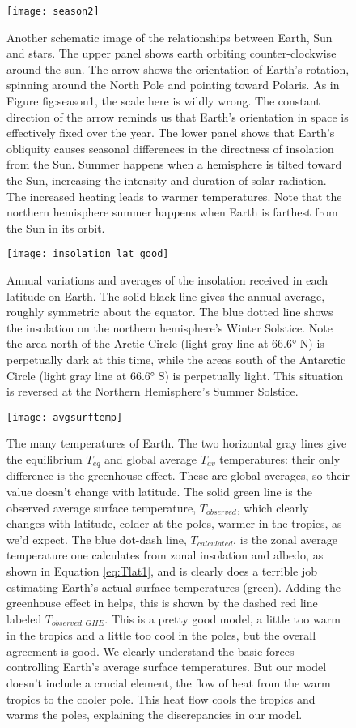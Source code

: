 \begin{figure}[p]
\centering
\texttt{[image: season2]}%
\caption{Another schematic image of the relationships between Earth, Sun and stars. The upper panel shows earth orbiting counter-clockwise around the sun. The arrow shows the orientation of Earth's rotation, spinning around the North Pole and pointing toward Polaris. As in Figure {fig:season1}, the scale here is wildly wrong. The constant direction of the arrow reminds us that Earth's orientation in space is effectively fixed over the year. The lower panel shows that Earth's obliquity causes seasonal differences in the directness of insolation from the Sun. Summer happens when a hemisphere is tilted toward the Sun, increasing the intensity and duration of solar radiation. The increased heating leads to warmer temperatures. Note that the northern hemisphere summer happens when Earth is farthest from the Sun in its orbit.}   
\label{fig:season2}
\end{figure}

\begin{figure}[p]
\centering
\texttt{[image: insolation\_lat\_good]}%
\caption{Annual variations and averages of the insolation received in each latitude on Earth. The solid black line gives the annual average, roughly symmetric about the equator. The blue dotted line shows the insolation on the northern hemisphere's Winter Solstice. Note the area north of the Arctic Circle (light gray line at \ang{66.6} N) is perpetually dark at this time, while the areas south of the Antarctic Circle (light gray line at \ang{66.6} S) is perpetually light. This situation is reversed at the Northern Hemisphere's Summer Solstice.}   
\label{fig:insolat}
\end{figure}

\begin{figure}[p]
\centering
\texttt{[image: avgsurftemp]}%
\caption{The many temperatures of Earth. The two horizontal gray lines give the equilibrium $T_{eq}$ and global average $T_{av}$ temperatures: their only difference is the greenhouse effect. These are global averages, so their value doesn't change with latitude. The solid green line is the observed average surface temperature, $T_{observed}$, which clearly changes with latitude, colder at the poles, warmer in the tropics, as we'd expect. The blue dot-dash line, $T_{calculated}$, is the zonal average temperature one calculates from zonal insolation and albedo, as shown in Equation \ref{eq:Tlat1}, and is clearly does a terrible job estimating Earth's actual surface temperatures (green). Adding the greenhouse effect in helps, this is shown by the dashed red line labeled $T_{observed, GHE}$. This is a pretty good model, a little too warm in the tropics and a little too cool in the poles, but the overall agreement is good. We clearly understand the basic forces controlling Earth's average surface temperatures. But our model doesn't include a crucial element, the flow of heat from the warm tropics to the cooler pole. This heat flow cools the tropics and warms the poles, explaining the discrepancies in our model.}
\label{fig:avgsurftemp}
\end{figure}

